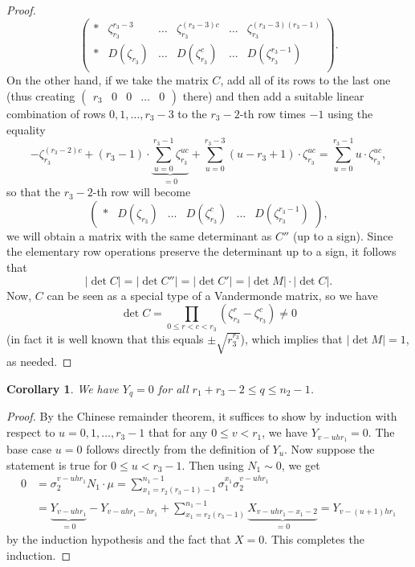 \documentclass[12pt,a4paper]{article}
\newtheorem{cor}[theorem]{Corollary}
\theoremstyle{definition}
\newcommand{\zt}{\zeta_{r_3}}
\begin{document}
\begin{proof}
$$\begin{pmatrix}
*& \zt^{r_3-3}& \dots & \zt^{(r_3-3)c} & \dots & \zt^{(r_3-3)(r_3-1)}\\ 
*& D(\zt)& \dots & D(\zt^c) & \dots & D(\zt^{r_3-1})\\ 
\end{pmatrix}.
$$
On the other hand, if we take the matrix $C$, add all of its rows to the last one (thus creating $\begin{pmatrix}
r_3 & 0 & 0& \dots &0
\end{pmatrix}$
there) and then add a suitable linear combination of rows $0,1,\dots, r_3-3$ to the $r_3-2$-th row times $-1$ using the equality
$$-\zt^{(r_3-2)c}+(r_3-1)\cdot\underbrace{\sum_{u=0}^{r_3-1}\zt^{uc}}_{=0}+\sum_{u=0}^{r_3-3}(u-r_3+1)\cdot\zt^{uc}=\sum_{u=0}^{r_3-1}u\cdot\zt^{uc},$$
so that the $r_3-2$-th row will become
$$\begin{pmatrix}
*& D(\zt)& \dots & D(\zt^c) & \dots & D(\zt^{r_3-1})
\end{pmatrix},$$
we will obtain a matrix with the same determinant as $C''$ (up to a sign). Since the elementary row operations preserve the determinant up to a sign, it follows that
$$|\det C|=|\det C''|=|\det C'|=|\det M|\cdot |\det C|.$$ 
Now, $C$ can be seen as a special type of a Vandermonde matrix, so we have $$\det C=\prod_{0\leq r<c<r_3}(\zt^r-\zt^c)\neq 0$$
(in fact it is well known that this equals $\pm \sqrt{r_3^{r_3}}$), which implies that %
 $|\det M|=1$, as needed.
\end{proof}

\begin{cor}
We have $Y_q=0$ for all $r_1+r_3-2\leq q\leq n_2-1$.
\end{cor}
\begin{proof}
By the Chinese remainder theorem, it suffices to show by induction with respect to $u=0,1,\dots,r_3-1$ that for any $0\leq v<r_1$, we have $Y_{v-uhr_1}=0.$ The base case $u=0$ follows directly from the definition of $Y_u$. Now suppose the statement is true for $0\leq u<r_3-1$. Then using $N_1\sim 0$, we get
\begin{align*}
0&=\sigma_2^{v-uhr_1} N_1 \cdot \mu=\sum_{x_1=r_2(r_3-1)-1}^{n_1-1}\sigma_1^{x_1}\sigma_2^{v-uhr_1}\\
&=\underbrace{Y_{v-uhr_1}}_{=0}-Y_{v-uhr_1-hr_1}+\sum_{x_1=r_2(r_3-1)}^{n_1-1}\underbrace {X_{v-uhr_1-x_1-2}}_{=0}=Y_{v-(u+1)hr_1}
\end{align*}
by the induction hypothesis and the fact that $X=0$. This completes the induction.
\end{proof}
\end{document}
